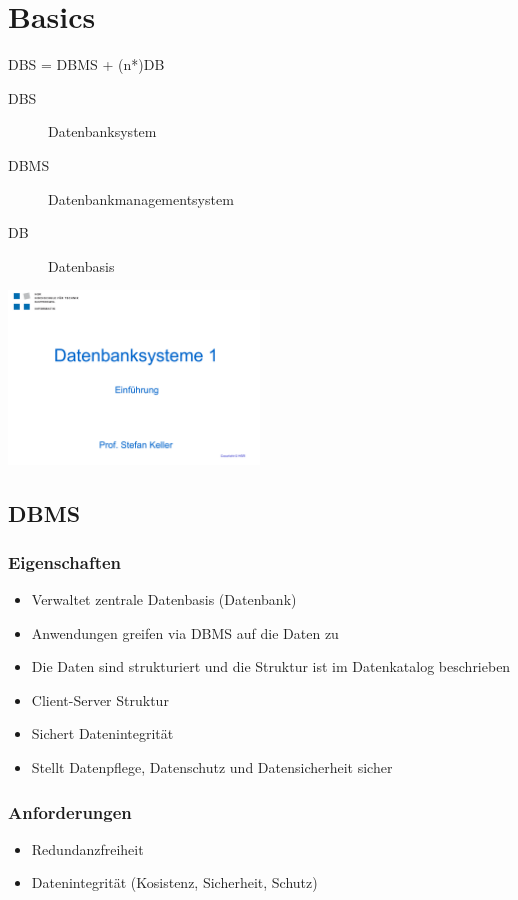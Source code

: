 \section{Basics}
    \begin{multicols}{2}
        DBS = DBMS + (n*)DB
        \begin{description}
        \item[DBS] Datenbanksystem
        \item[DBMS] Datenbankmanagementsystem
        \item[DB] Datenbasis
        \end{description}
        \includegraphics[page=13,trim=20 40 20 140,clip=true,width=0.5\textwidth]{images/einfuehrung.pdf}
    \end{multicols}
    \subsection {DBMS}
        \subsubsection{Eigenschaften}
            \begin{itemize}
              \item Verwaltet zentrale Datenbasis (Datenbank)
              \item Anwendungen greifen via DBMS auf die Daten zu
              \item Die Daten sind strukturiert und die Struktur ist im Datenkatalog beschrieben
              \item Client-Server Struktur
              \item Sichert Datenintegrität
              \item Stellt Datenpflege, Datenschutz und Datensicherheit sicher
            \end{itemize}
        \subsubsection{Anforderungen}
           \begin{itemize}
             \item Redundanzfreiheit
             \item Datenintegrität (Kosistenz, Sicherheit, Schutz)
           \end{itemize}
